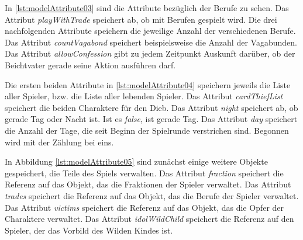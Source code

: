 \medskip
\begin{center}
	\begin{minipage}{0.7\textwidth}
		
	\end{minipage}
\end{center}

In \autoref{lst:modelAttribute03} sind die Attribute bezüglich der Berufe zu sehen. 
Das Attribut \textit{playWithTrade} speichert ab, ob mit Berufen gespielt wird. Die drei nachfolgenden Attribute speichern die jeweilige Anzahl der verschiedenen Berufe. Das Attribut \textit{countVagabond} speichert beispielsweise die Anzahl der Vagabunden. Das Attribut \textit{allowConfession} gibt zu jedem Zeitpunkt Auskunft darüber, ob der Beichtvater gerade seine Aktion ausführen darf. 

\medskip
\begin{center}
	\begin{minipage}{0.7\textwidth}
		
	\end{minipage}
\end{center}

Die ersten beiden Attribute in \autoref{lst:modelAttribute04} speichern jeweils die Liste aller Spieler, bzw. die Liste aller lebenden Spieler. 
Das Attribut \textit{cardThiefList} speichert die beiden Charaktere für den Dieb. 
Das Attribut \textit{night} speichert ab, ob gerade Tag oder Nacht ist. Ist es \textit{false}, ist gerade Tag. 
Das Attribut \textit{day} speichert die Anzahl der Tage, die seit Beginn der Spielrunde verstrichen sind. Begonnen wird mit der Zählung bei eins. 

\medskip
\begin{center}
	\begin{minipage}{0.7\textwidth}
		
	\end{minipage}
\end{center}

In Abbildung \autoref{lst:modelAttribute05} sind zunächst einige weitere Objekte gespeichert, die Teile des Spiels verwalten. Das Attribut \textit{fraction} speichert die Referenz auf das Objekt, das die Fraktionen der Spieler verwaltet. 
Das Attribut \textit{trades} speichert die Referenz auf das Objekt, das die Berufe der Spieler verwaltet. 
Das Attribut \textit{victims} speichert die Referenz auf das Objekt, das die Opfer der Charaktere verwaltet. 
Das Attribut \textit{idolWildChild} speichert die Referenz auf den Spieler, der das Vorbild des Wilden Kindes ist. 

